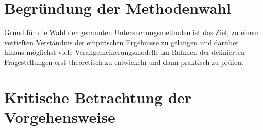 \section{Begründung der Methodenwahl} 

Grund für die Wahl der genannten Untersuchungsmethoden ist das Ziel, zu einem vertieften Verständnis der empirischen Ergebnisse zu gelangen und darüber hinaus möglichst viele Verallgemeinerungsmodelle im Rahmen der definierten Fragestellungen erst theoretisch zu entwickeln und dann praktisch zu prüfen.

\section{Kritische Betrachtung der Vorgehensweise} 
